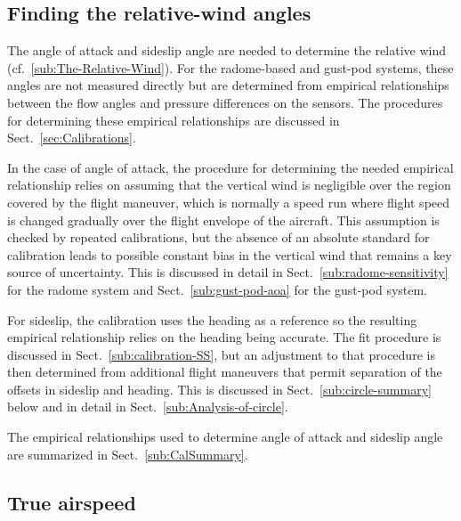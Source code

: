 \documentclass[12pt,twoside,english]{article}\usepackage[]{graphicx}\usepackage[]{color}
\let\OrgIndex\index
\renewcommand*{\index}[1]{\OrgIndex{#1}}
\begin{document}
\subsection{Finding the relative-wind angles}

The angle of attack and sideslip angle are needed to determine the relative wind (cf.~\ref{sub:The-Relative-Wind}). For the radome-based and gust-pod systems, these angles are not measured directly but are determined from empirical relationships between the flow angles and pressure differences on the sensors. The procedures for determining these empirical relationships are discussed in Sect.~\ref{sec:Calibrations}. 

In the case of angle of attack, the procedure for determining the needed empirical relationship relies on assuming that the vertical wind is negligible over the region covered by the flight maneuver, which is normally a \textquotedbl{}speed run\textquotedbl{} where flight speed is changed gradually over the flight envelope of the aircraft. This assumption is checked by repeated calibrations, but the absence of an absolute standard for calibration leads to possible constant bias in the vertical wind that remains a key source of uncertainty. This is discussed in detail in Sect.~\ref{sub:radome-sensitivity} for the radome system and Sect.~\ref{sub:gust-pod-aoa} for the gust-pod system. 

For sideslip, the calibration uses the heading as a reference so the resulting empirical relationship relies on the heading being accurate. The fit procedure is discussed in Sect.~\ref{sub:calibration-SS}, but an adjustment to that procedure is then determined from additional flight maneuvers that permit separation of the offsets in sideslip and heading. This is discussed in Sect.~\ref{sub:circle-summary} below and in detail in Sect.~\ref{sub:Analysis-of-circle}. 

The empirical relationships used to determine angle of attack and sideslip angle are summarized in Sect.~\ref{sub:CalSummary}. 

\subsection{True airspeed}
\end{document}
